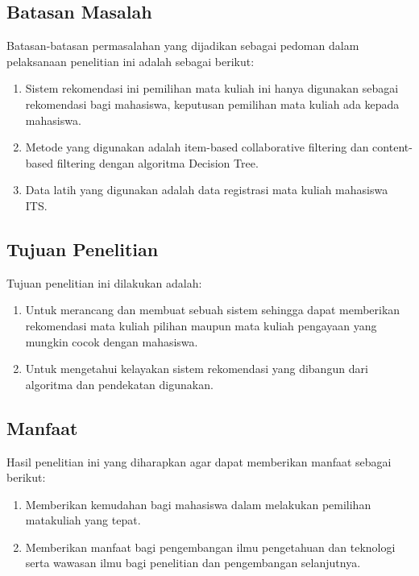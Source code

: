 \subsection{Batasan Masalah}
Batasan-batasan permasalahan yang dijadikan sebagai pedoman dalam pelaksanaan penelitian ini adalah sebagai berikut:
\begin{enumerate}[noitemsep]
      \item Sistem rekomendasi ini pemilihan mata kuliah
            ini hanya digunakan sebagai rekomendasi bagi
            mahasiswa, keputusan pemilihan mata kuliah
            ada kepada mahasiswa.
      \item Metode yang digunakan adalah item-based
            collaborative filtering dan content-based
            filtering dengan algoritma Decision Tree.
      \item Data latih yang digunakan adalah data registrasi mata kuliah mahasiswa ITS.
\end{enumerate}

\subsection{Tujuan Penelitian}
Tujuan penelitian ini dilakukan adalah:
\begin{enumerate}[noitemsep]
      \item Untuk merancang dan membuat sebuah sistem sehingga dapat memberikan rekomendasi mata kuliah pilihan
            maupun mata kuliah pengayaan yang mungkin cocok dengan mahasiswa.
      \item Untuk mengetahui kelayakan sistem rekomendasi yang dibangun dari algoritma dan pendekatan
            digunakan.
\end{enumerate}

\subsection{Manfaat}
Hasil penelitian ini yang diharapkan agar dapat memberikan manfaat sebagai berikut:
\begin{enumerate}[noitemsep]
      \item Memberikan kemudahan bagi mahasiswa dalam melakukan pemilihan matakuliah yang tepat.
      \item Memberikan manfaat bagi pengembangan ilmu pengetahuan dan teknologi serta wawasan ilmu bagi
            penelitian dan pengembangan selanjutnya.
\end{enumerate}